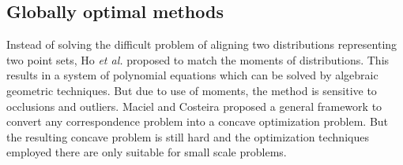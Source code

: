 \documentclass[11pt,bezier,]{article}
\begin{document}
\subsection{Globally optimal methods}
Instead of solving the difficult problem of aligning two distributions representing two point sets,
Ho \textit{et al.} \cite{algebraic_moment}  proposed to match the moments of  distributions.
This   results in a system of polynomial equations
which can  be solved by algebraic geometric techniques.
But due to use of moments,
the method is  sensitive to occlusions and outliers.
Maciel and Costeira \cite{correspondence_concave} proposed a general framework 
to convert any correspondence problem into a concave optimization problem.
But the resulting concave problem is still hard 
and the optimization techniques employed there are only suitable for small scale problems.
\end{document}
